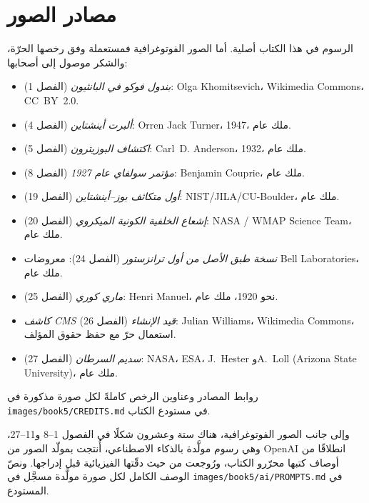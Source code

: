 \chapter*{مصادر الصور}

الرسوم في هذا الكتاب أصلية. أما الصور الفوتوغرافية فمستعملة وفق
رخصها الحرّة، والشكر موصول إلى أصحابها:

\begin{itemize}
  \item \emph{بندول فوكو في البانثيون} (الفصل 1): Olga
        Khomitsevich، Wikimedia Commons، CC~BY~2.0.
  \item \emph{ألبرت أينشتاين} (الفصل 4): Orren Jack Turner، 1947،
        ملك عام.
  \item \emph{اكتشاف البوزيترون} (الفصل 5): Carl~D. Anderson،
        1932، ملك عام.
  \item \emph{مؤتمر سولفاي عام 1927} (الفصل 8): Benjamin Couprie،
        ملك عام.
  \item \emph{أول متكاثف بوز--أينشتاين} (الفصل 19):
        NIST/JILA/CU-Boulder، ملك عام.
  \item \emph{إشعاع الخلفية الكونية الميكروي} (الفصل 20):
        NASA / WMAP Science Team، ملك عام.
  \item \emph{نسخة طبق الأصل من أول ترانزستور} (الفصل 24): معروضات
        Bell Laboratories، ملك عام.
  \item \emph{ماري كوري} (الفصل 25): Henri Manuel، نحو 1920، ملك
        عام.
  \item \emph{كاشف CMS قيد الإنشاء} (الفصل 26): Julian Williams،
        Wikimedia Commons، استعمال حرّ مع حفظ حقوق المؤلف.
  \item \emph{سديم السرطان} (الفصل 27): NASA، ESA، J.~Hester
        وA.~Loll (Arizona State University)، ملك عام.
\end{itemize}

روابط المصادر وعناوين الرخص كاملةً لكل صورة مذكورة
في \texttt{images/book5/CREDITS.md} في مستودع الكتاب.

\bigskip
وإلى جانب الصور الفوتوغرافية، هناك ستة وعشرون شكلًا في الفصول 1--8
و11--27، وهي رسوم مولَّدة بالذكاء الاصطناعي، أُنتجت بمولّد الصور من
OpenAI انطلاقًا من أوصاف كتبها محرّرو الكتاب، ورُوجعت من حيث دقّتها
الفيزيائية قبل إدراجها. ونصّ الوصف الكامل لكل صورة مولَّدة مسجَّل في
\texttt{images/book5/ai/PROMPTS.md} في المستودع.
\clearpage
